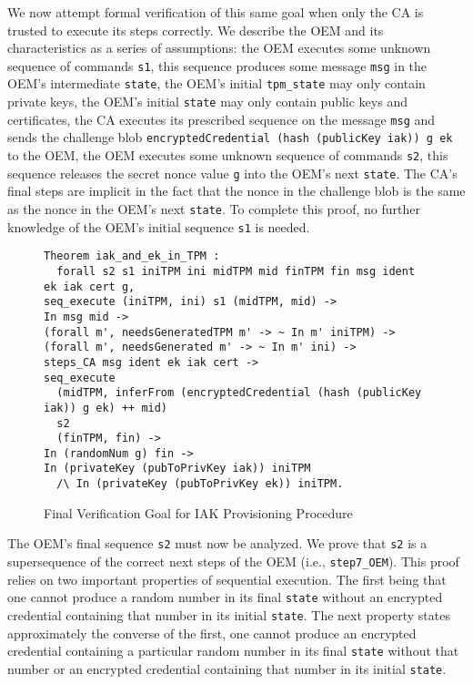 \documentclass[runningheads]{llncs}
\begin{document}
We now attempt formal verification of this same goal when only the CA
is trusted to execute its steps correctly.  We describe the OEM and its
characteristics as a series of assumptions: the OEM executes some
unknown sequence of commands \verb|s1|, this sequence produces some
message \verb|msg| in the OEM's intermediate \verb|state|, the OEM's
initial \verb|tpm_state| may only contain private keys, the OEM's
initial \verb|state| may only contain public keys and certificates,
the CA executes its prescribed sequence on the message \verb|msg| and
sends the challenge blob
\verb|encryptedCredential (hash (publicKey iak)) g ek| to the OEM, the
OEM executes some unknown sequence of commands \verb|s2|, this
sequence releases the secret nonce value \verb|g| into the OEM's next
\verb|state|. The CA's final steps are implicit in the fact that the
nonce in the challenge blob is the same as the nonce in the OEM's next
\verb|state|.  To complete this proof, no further knowledge of the OEM's initial
sequence \verb|s1| is needed.  

\begin{figure}[hptb]
\begin{lstlisting}[language=Coq]
Theorem iak_and_ek_in_TPM :
  forall s2 s1 iniTPM ini midTPM mid finTPM fin msg ident ek iak cert g,
seq_execute (iniTPM, ini) s1 (midTPM, mid) -> 
In msg mid ->
(forall m', needsGeneratedTPM m' -> ~ In m' iniTPM) ->
(forall m', needsGenerated m' -> ~ In m' ini) ->
steps_CA msg ident ek iak cert ->
seq_execute
  (midTPM, inferFrom (encryptedCredential (hash (publicKey iak)) g ek) ++ mid)
  s2 
  (finTPM, fin) ->
In (randomNum g) fin ->
In (privateKey (pubToPrivKey iak)) iniTPM
  /\ In (privateKey (pubToPrivKey ek)) iniTPM.
\end{lstlisting}
\caption{Final Verification Goal for IAK Provisioning Procedure}
\label{fig:iak_goal}
\end{figure}

The OEM's final sequence \verb|s2| must now be analyzed.  We prove
that \verb|s2| is a supersequence of the correct next steps of the OEM
(i.e., \verb|step7_OEM|). This proof relies on two important
properties of sequential execution. The first being that one cannot
produce a random number in its final \verb|state| without an encrypted
credential containing that number in its initial \verb|state|. The
next property states approximately the converse of the first, one
cannot produce an encrypted credential containing a particular random
number in its final \verb|state| without that number or an encrypted
credential containing that number in its initial \verb|state|.
\end{document}
